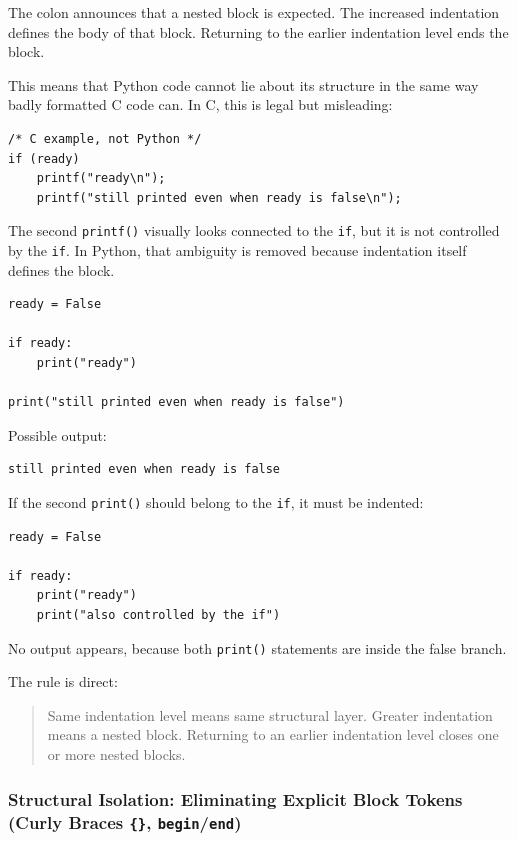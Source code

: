 \documentclass[a4paper,twoside]{report}
\begin{document}
The colon announces that a nested block is expected. The increased indentation defines the body of that block. Returning to the earlier indentation level ends the block.

This means that Python code cannot lie about its structure in the same way badly formatted C code can. In C, this is legal but misleading:

\begin{verbatim}
/* C example, not Python */
if (ready)
    printf("ready\n");
    printf("still printed even when ready is false\n");
\end{verbatim}

The second \texttt{printf()} visually looks connected to the \texttt{if}, but it is not controlled by the \texttt{if}. In Python, that ambiguity is removed because indentation itself defines the block.

\begin{verbatim}
ready = False

if ready:
    print("ready")

print("still printed even when ready is false")
\end{verbatim}

Possible output:

\begin{verbatim}
still printed even when ready is false
\end{verbatim}

If the second \texttt{print()} should belong to the \texttt{if}, it must be indented:

\begin{verbatim}
ready = False

if ready:
    print("ready")
    print("also controlled by the if")
\end{verbatim}

No output appears, because both \texttt{print()} statements are inside the false branch.

The rule is direct:

\begin{quote}
Same indentation level means same structural layer. Greater indentation means a nested block. Returning to an earlier indentation level closes one or more nested blocks.
\end{quote}

\subsubsection{Structural Isolation: Eliminating Explicit Block Tokens (Curly Braces \texttt{\{\}}, \texttt{begin}/\texttt{end})}
\end{document}
